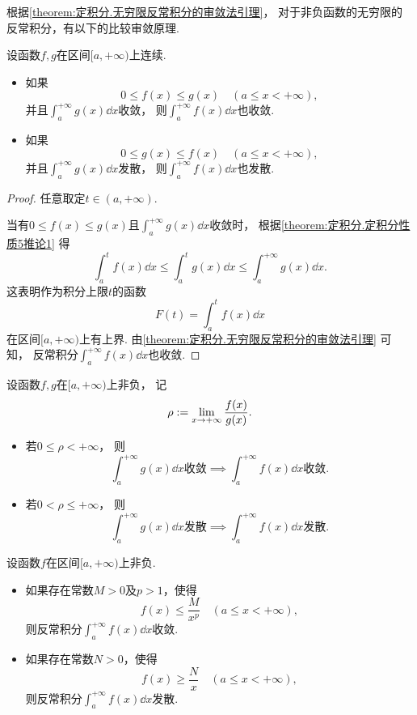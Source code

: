 根据\cref{theorem:定积分.无穷限反常积分的审敛法引理}，
对于非负函数的无穷限的反常积分，有以下的比较审敛原理.
\begin{theorem}[比较审敛原理]\label{theorem:定积分.无穷限反常积分的比较审敛原理}
设函数\(f,g\)在区间\([a,+\infty)\)上连续.
\begin{itemize}
	\item 如果\[
		0 \leq f(x) \leq g(x)
		\quad(a \leq x < +\infty),
	\]
	并且\(\int_a^{+\infty} g(x) \dd{x}\)收敛，
	则\(\int_a^{+\infty} f(x) \dd{x}\)也收敛.

	\item 如果\[
		0 \leq g(x) \leq f(x)
		\quad(a \leq x < +\infty),
	\]
	并且\(\int_a^{+\infty} g(x) \dd{x}\)发散，
	则\(\int_a^{+\infty} f(x) \dd{x}\)也发散.
\end{itemize}
\begin{proof}
任意取定\(t \in (a,+\infty)\).

当有\(0 \leq f(x) \leq g(x)\)且\(\int_a^{+\infty} g(x) \dd{x}\)收敛时，
根据\cref{theorem:定积分.定积分性质5推论1}
得\[
	\int_a^t f(x) \dd{x}
	\leq
	\int_a^t g(x) \dd{x}
	\leq
	\int_a^{+\infty} g(x) \dd{x}.
\]
这表明作为积分上限\(t\)的函数\[
	F(t) = \int_a^t f(x) \dd{x}
\]
在区间\([a,+\infty)\)上有上界.
由\cref{theorem:定积分.无穷限反常积分的审敛法引理} 可知，
反常积分\(\int_a^{+\infty} f(x) \dd{x}\)也收敛.
\end{proof}
\end{theorem}

\begin{corollary}[比较审敛原理的极限形式]
设函数\(f,g\)在\([a,+\infty)\)上非负，
记\[
	\rho := \lim_{x\to+\infty} \frac{f(x)}{g(x)}.
\]
\begin{itemize}
	\item 若\(0 \leq \rho < +\infty\)，
	则\[
		\text{\(\int_a^{+\infty} g(x) \dd{x}\)收敛}
		\implies
		\text{\(\int_a^{+\infty} f(x) \dd{x}\)收敛}.
	\]
	\item 若\(0 < \rho \leq +\infty\)，
	则\[
		\text{\(\int_a^{+\infty} g(x) \dd{x}\)发散}
		\implies
		\text{\(\int_a^{+\infty} f(x) \dd{x}\)发散}.
	\]
\end{itemize}
\end{corollary}

\begin{theorem}[比较审敛法1]\label{theorem:定积分.无穷限反常积分的比较审敛法}
设函数\(f\)在区间\([a,+\infty)\)上非负.
\begin{itemize}
	\item 如果存在常数\(M>0\)及\(p>1\)，使得\[
		f(x) \leq \frac{M}{x^p}
		\quad(a \leq x < +\infty),
	\]
	则反常积分\(\int_a^{+\infty} f(x) \dd{x}\)收敛.
	\item 如果存在常数\(N>0\)，使得\[
		f(x) \geq \frac{N}{x}
		\quad(a \leq x < +\infty),
	\]
	则反常积分\(\int_a^{+\infty} f(x) \dd{x}\)发散.
\end{itemize}
\end{theorem}

